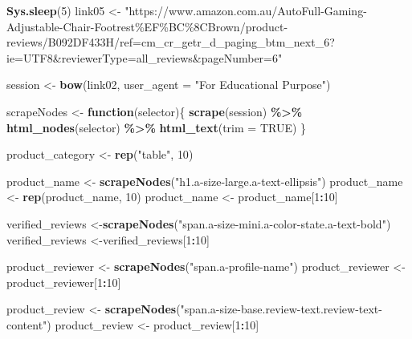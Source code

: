 \documentclass[
]{article}
\newenvironment{Shaded}{\begin{snugshade}}{\end{snugshade}}
\newcommand{\AttributeTok}[1]{\textcolor[rgb]{0.13,0.29,0.53}{#1}}
\newcommand{\ConstantTok}[1]{\textcolor[rgb]{0.56,0.35,0.01}{#1}}
\newcommand{\ControlFlowTok}[1]{\textcolor[rgb]{0.13,0.29,0.53}{\textbf{#1}}}
\newcommand{\DecValTok}[1]{\textcolor[rgb]{0.00,0.00,0.81}{#1}}
\newcommand{\FunctionTok}[1]{\textcolor[rgb]{0.13,0.29,0.53}{\textbf{#1}}}
\newcommand{\NormalTok}[1]{#1}
\newcommand{\OtherTok}[1]{\textcolor[rgb]{0.56,0.35,0.01}{#1}}
\newcommand{\SpecialCharTok}[1]{\textcolor[rgb]{0.81,0.36,0.00}{\textbf{#1}}}
\newcommand{\StringTok}[1]{\textcolor[rgb]{0.31,0.60,0.02}{#1}}
\begin{document}
\begin{Shaded}
\begin{Highlighting}[]
   \FunctionTok{Sys.sleep}\NormalTok{(}\DecValTok{5}\NormalTok{)}
\NormalTok{link05 }\OtherTok{\textless{}{-}} \StringTok{"https://www.amazon.com.au/AutoFull{-}Gaming{-}Adjustable{-}Chair{-}Footrest\%EF\%BC\%8CBrown/product{-}reviews/B092DF433H/ref=cm\_cr\_getr\_d\_paging\_btm\_next\_6?ie=UTF8\&reviewerType=all\_reviews\&pageNumber=6"}


\NormalTok{  session }\OtherTok{\textless{}{-}} \FunctionTok{bow}\NormalTok{(link02,}
               \AttributeTok{user\_agent =} \StringTok{"For Educational Purpose"}\NormalTok{)}

\NormalTok{  scrapeNodes }\OtherTok{\textless{}{-}} \ControlFlowTok{function}\NormalTok{(selector)\{}
    \FunctionTok{scrape}\NormalTok{(session) }\SpecialCharTok{\%\textgreater{}\%}
      \FunctionTok{html\_nodes}\NormalTok{(selector) }\SpecialCharTok{\%\textgreater{}\%}
      \FunctionTok{html\_text}\NormalTok{(}\AttributeTok{trim =} \ConstantTok{TRUE}\NormalTok{)}
\NormalTok{  \}}

\NormalTok{  product\_category }\OtherTok{\textless{}{-}} \FunctionTok{rep}\NormalTok{(}\StringTok{"table"}\NormalTok{, }\DecValTok{10}\NormalTok{)}

\NormalTok{  product\_name }\OtherTok{\textless{}{-}} \FunctionTok{scrapeNodes}\NormalTok{(}\StringTok{"h1.a{-}size{-}large.a{-}text{-}ellipsis"}\NormalTok{)}
\NormalTok{  product\_name }\OtherTok{\textless{}{-}} \FunctionTok{rep}\NormalTok{(product\_name, }\DecValTok{10}\NormalTok{)}
\NormalTok{  product\_name }\OtherTok{\textless{}{-}}\NormalTok{ product\_name[}\DecValTok{1}\SpecialCharTok{:}\DecValTok{10}\NormalTok{]}
  
\NormalTok{  verified\_reviews }\OtherTok{\textless{}{-}}\FunctionTok{scrapeNodes}\NormalTok{(}\StringTok{"span.a{-}size{-}mini.a{-}color{-}state.a{-}text{-}bold"}\NormalTok{)}
\NormalTok{  verified\_reviews }\OtherTok{\textless{}{-}}\NormalTok{verified\_reviews[}\DecValTok{1}\SpecialCharTok{:}\DecValTok{10}\NormalTok{]}
  
\NormalTok{  product\_reviewer }\OtherTok{\textless{}{-}} \FunctionTok{scrapeNodes}\NormalTok{(}\StringTok{"span.a{-}profile{-}name"}\NormalTok{)}
\NormalTok{  product\_reviewer }\OtherTok{\textless{}{-}}\NormalTok{ product\_reviewer[}\DecValTok{1}\SpecialCharTok{:}\DecValTok{10}\NormalTok{]}
  
\NormalTok{  product\_review }\OtherTok{\textless{}{-}} \FunctionTok{scrapeNodes}\NormalTok{(}\StringTok{"span.a{-}size{-}base.review{-}text.review{-}text{-}content"}\NormalTok{)}
\NormalTok{  product\_review }\OtherTok{\textless{}{-}}\NormalTok{ product\_review[}\DecValTok{1}\SpecialCharTok{:}\DecValTok{10}\NormalTok{]}
  

\end{Highlighting}
\end{Shaded}
\end{document}

